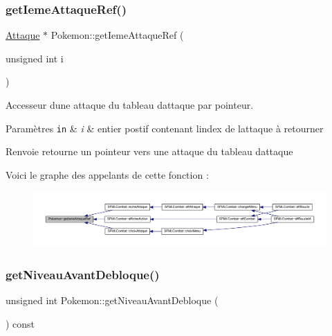 \subsubsection{\texorpdfstring{get\+Ieme\+Attaque\+Ref()}{getIemeAttaqueRef()}}
{\footnotesize\ttfamily \hyperlink{class_attaque}{Attaque} $\ast$ Pokemon\+::get\+Ieme\+Attaque\+Ref (\begin{DoxyParamCaption}\item[{unsigned int}]{i }\end{DoxyParamCaption})}



Accesseur d\textquotesingle{}une attaque du tableau d\textquotesingle{}attaque par pointeur. 


\begin{DoxyParams}[1]{Paramètres}
\mbox{\tt in}  & {\em i} & entier postif contenant l\textquotesingle{}index de l\textquotesingle{}attaque à retourner \\
\hline
\end{DoxyParams}
\begin{DoxyReturn}{Renvoie}
retourne un pointeur vers une attaque du tableau d\textquotesingle{}attaque 
\end{DoxyReturn}
Voici le graphe des appelants de cette fonction \+:\nopagebreak
\begin{figure}[H]
\begin{center}
\leavevmode
\includegraphics[width=350pt]{class_pokemon_a5688276dbf96174ceccec44d416f2df6_icgraph}
\end{center}
\end{figure}
\mbox{\label{class_pokemon_a84a91b991611246fa387ede48e18d357}} 
\subsubsection{\texorpdfstring{get\+Niveau\+Avant\+Debloque()}{getNiveauAvantDebloque()}}
{\footnotesize\ttfamily unsigned int Pokemon\+::get\+Niveau\+Avant\+Debloque (\begin{DoxyParamCaption}{ }\end{DoxyParamCaption}) const}



